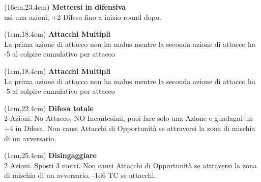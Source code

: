 \documentclass[a4paper,12 pt,openany]{book}
\begin{document}
\begin{textblock*}{4cm}(16cm,23.4cm) %
	\textbf{Mettersi in difensiva}\\
usi una azioni, +2 Difesa fino a inizio round dopo.
\end{textblock*}

\begin{textblock*}{4cm}(1cm,18.4cm) %
	\textbf{Attacchi Multipli}\\
La prima azione di attacco non ha malus mentre la seconda azione di attacco ha -5 al colpire cumulativo per attacco
\end{textblock*}


\begin{textblock*}{4cm}(1cm,18.4cm) %
	\textbf{Attacchi Multipli}\\
	La prima azione di attacco non ha malus mentre la seconda azione di attacco ha -5 al colpire cumulativo per attacco
\end{textblock*}




\begin{textblock*}{8cm}(1cm,22.4cm) %
\textbf{Difesa totale}\\
2 Azioni. No Attacco, NO Incantesimi, puoi fare solo una Azione e guadagni un +4 in Difesa. Non causi Attacchi di Opportunità se attraversi la zona di mischia di un avversario.
\end{textblock*}

\begin{textblock*}{8cm}(1cm,25.4cm) %
\textbf{Disingaggiare}\\
2 Azioni. Sposti 3 metri. Non causi Attacchi di Opportunità se attraversi la zona di mischia di un avversario. -1d6 TC se attacchi.
\end{textblock*}
\end{document}
